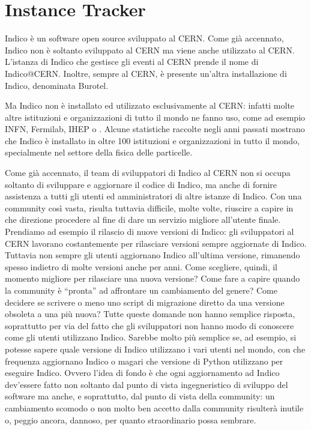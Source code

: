 \chapter{Instance Tracker} \label{chap:instance_tracker}

    Indico è un software open source sviluppato al \ac{CERN}. Come già accennato, Indico non è soltanto sviluppato al \ac{CERN} ma viene anche utilizzato al \ac{CERN}. L'istanza di Indico che gestisce gli eventi al \ac{CERN} prende il nome di Indico@CERN. Inoltre, sempre al \ac{CERN}, è presente un'altra installazione di Indico, denominata Burotel.
    
    Ma Indico non è installato ed utilizzato esclusivamente al \ac{CERN}: infatti molte altre istituzioni e organizzazioni di tutto il mondo ne fanno uso, come ad esempio \ac{INFN}, Fermilab, \ac{IHEP} o . Alcune statistiche raccolte negli anni passati mostrano che Indico è installato in oltre 100 istituzioni e organizzazioni in tutto il mondo, specialmente nel settore della fisica delle particelle.
    
    Come già accennato, il team di sviluppatori di Indico al \ac{CERN} non si occupa soltanto di sviluppare e aggiornare il codice di Indico, ma anche di fornire assistenza a tutti gli utenti ed amministratori di altre istanze di Indico. Con una community così vasta, risulta tuttavia difficile, molte volte, riuscire a capire in che direzione procedere al fine di dare un servizio migliore all'utente finale. Prendiamo ad esempio il rilascio di nuove versioni di Indico: gli sviluppatori al \ac{CERN} lavorano costantemente per rilasciare versioni sempre aggiornate di Indico. Tuttavia non sempre gli utenti aggiornano Indico all'ultima versione, rimanendo spesso indietro di molte versioni anche per anni. Come scegliere, quindi, il momento migliore per rilasciare una nuova versione? Come fare a capire quando la community è ``pronta'' ad affrontare un cambiamento del genere? Come decidere se scrivere o meno uno script di migrazione diretto da una versione obsoleta a una più nuova? Tutte queste domande non hanno semplice risposta, soprattutto per via del fatto che gli sviluppatori non hanno modo di conoscere come gli utenti utilizzano Indico. Sarebbe molto più semplice se, ad esempio, si potesse sapere quale versione di Indico utilizzano i vari utenti nel mondo, con che frequenza aggiornano Indico o magari che versione di Python utilizzano per eseguire Indico. Ovvero l'idea di fondo è che ogni aggiornamento ad Indico dev'essere fatto non soltanto dal punto di vista ingegneristico di sviluppo del software ma anche, e soprattutto, dal punto di vista della community: un cambiamento scomodo o non molto ben accetto dalla community risulterà inutile o, peggio ancora, dannoso, per quanto straordinario possa sembrare.
    
